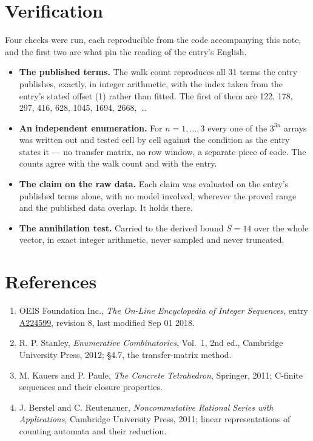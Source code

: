 \documentclass[11pt]{article}
\theoremstyle{definition}
\begin{document}
\section{Verification}

Four checks were run, each reproducible from the code accompanying this note, and the first two are what pin the reading of the entry's English.

\begin{itemize}

\item {\bfseries The published terms.} The walk count reproduces all 31 terms the entry publishes, exactly, in integer arithmetic, with the index taken from the entry's stated offset (1) rather than fitted. The first of them are 122, 178, 297, 416, 628, 1045, 1694, 2668,~\dots

\item {\bfseries An independent enumeration.} For $n = 1,\dots,3$ every one of the $3^{3n}$ arrays was written out and tested cell by cell against the condition as the entry states it --- no transfer matrix, no row window, a separate piece of code. The counts agree with the walk count and with the entry.

\item {\bfseries The claim on the raw data.} Each claim was evaluated on the entry's published terms alone, with no model involved, wherever the proved range and the published data overlap. It holds there.

\item {\bfseries The annihilation test.} Carried to the derived bound $S = 14$ over the whole vector, in exact integer arithmetic, never sampled and never truncated.

\end{itemize}

\section{References}

\begin{enumerate}

\item OEIS Foundation Inc., \emph{The On-Line Encyclopedia of Integer Sequences}, entry \href{https://oeis.org/A224599}{A224599}, revision 8, last modified Sep 01 2018.

\item R. P. Stanley, \emph{Enumerative Combinatorics}, Vol.~1, 2nd ed., Cambridge University Press, 2012; \S4.7, the transfer-matrix method.

\item M. Kauers and P. Paule, \emph{The Concrete Tetrahedron}, Springer, 2011; C-finite sequences and their closure properties.

\item J. Berstel and C. Reutenauer, \emph{Noncommutative Rational Series with Applications}, Cambridge University Press, 2011; linear representations of counting automata and their reduction.

\end{enumerate}
\end{document}
